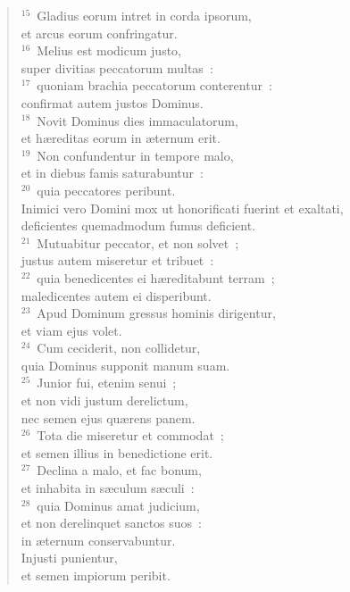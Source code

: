 \begin{verse}
${}^{15}$~Gladius eorum intret in corda ipsorum,\\ et arcus eorum confringatur.\\
${}^{16}$~Melius est modicum justo,\\ super divitias peccatorum multas~:\\
${}^{17}$~quoniam brachia peccatorum conterentur~:\\ confirmat autem justos Dominus.\\
${}^{18}$~Novit Dominus dies immaculatorum,\\ et h\ae reditas eorum in \ae ternum erit.\\
${}^{19}$~Non confundentur in tempore malo,\\ et in diebus famis saturabuntur~:\\
${}^{20}$~quia peccatores peribunt.\\ Inimici vero Domini mox ut honorificati fuerint et exaltati,\\ deficientes quemadmodum fumus deficient.\\
${}^{21}$~Mutuabitur peccator, et non solvet~;\\ justus autem miseretur et tribuet~:\\
${}^{22}$~quia benedicentes ei h\ae reditabunt terram~;\\ maledicentes autem ei disperibunt.\\
${}^{23}$~Apud Dominum gressus hominis dirigentur,\\ et viam ejus volet.\\
${}^{24}$~Cum ceciderit, non collidetur,\\ quia Dominus supponit manum suam.\\
${}^{25}$~Junior fui, etenim senui~;\\ et non vidi justum derelictum,\\ nec semen ejus qu\ae rens panem.\\
${}^{26}$~Tota die miseretur et commodat~;\\ et semen illius in benedictione erit.\\
${}^{27}$~Declina a malo, et fac bonum,\\ et inhabita in s\ae culum s\ae culi~:\\
${}^{28}$~quia Dominus amat judicium,\\ et non derelinquet sanctos suos~:\\ in \ae ternum conservabuntur.\\ Injusti punientur,\\ et semen impiorum peribit.\\

\end{verse}

